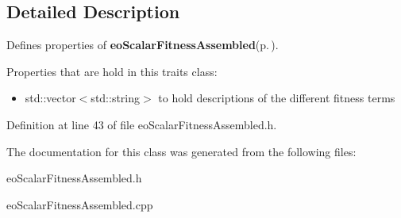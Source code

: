 \subsection{Detailed Description}
Defines properties of {\bf eo\-Scalar\-Fitness\-Assembled}{\rm (p.\,\pageref{classeo_scalar_fitness_assembled})}. 

Properties that are hold in this traits class:\begin{itemize}
\item std::vector$<$std::string$>$ to hold descriptions of the different fitness terms \end{itemize}




Definition at line 43 of file eo\-Scalar\-Fitness\-Assembled.h.

The documentation for this class was generated from the following files:\begin{CompactItemize}
\item 
eo\-Scalar\-Fitness\-Assembled.h\item 
eo\-Scalar\-Fitness\-Assembled.cpp\end{CompactItemize}
